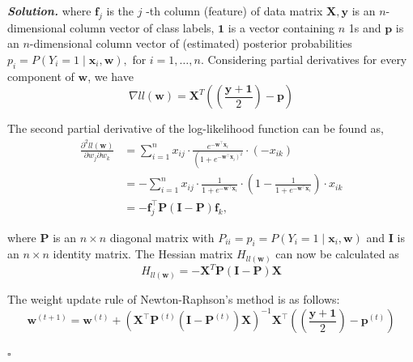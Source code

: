 \documentclass[10pt]{article}
\newenvironment{solution}[1][\it{Solution}]{\textbf{#1. } }{$\square$}
\begin{document}
\begin{solution}
where $\mathbf{f}_{j}$ is the $j$ -th column (feature) of data matrix $\mathbf{X}, \mathbf{y}$ is an $n$-dimensional column vector of class labels, $\mathbf{1}$ is a vector containing $n$ 1s and $\mathbf{p}$ is an $n$-dimensional column vector of (estimated) posterior probabilities $p_{i}=P\left(Y_{i}=1 \mid \mathbf{x}_{i}, \mathbf{w}\right),$ for $i=1, \ldots, n$. Considering partial derivatives for every component of $\mathbf{w}$, we have
$$
\nabla ll(\mathbf{w})=\mathbf{X}^{T}\left(\left(\frac{\mathbf{y} + \mathbf{1}}{2}\right)-\mathbf{p}\right)
$$

The second partial derivative of the log-likelihood function can be found as,
$$
\begin{aligned}
\frac{\partial^{2} l l(\mathbf{w})}{\partial w_{j} \partial w_{k}} &=\sum_{i=1}^{n} x_{ij} \cdot \frac{e^{-\mathbf{w}^{\top} \mathbf{x}_{i}}}{\left(1+e^{\left.-\mathbf{w}^{\top} \mathbf{x}_{i}\right)^{2}}\right.} \cdot\left(-x_{i k}\right) \\
&=-\sum_{i=1}^{n} x_{i j} \cdot \frac{1}{1+e^{-\mathbf{w}^{\top} \mathbf{x}_{i}}} \cdot\left(1-\frac{1}{1+e^{-\mathbf{w}^{\top} \mathbf{x}_{i}}}\right) \cdot x_{i k} \\
&=-\mathbf{f}_{j}^{\top} \mathbf{P}(\mathbf{I}-\mathbf{P}) \mathbf{f}_{k},
\end{aligned}
$$

where $\mathbf{P}$ is an $n \times n$ diagonal matrix with $P_{i i}=p_{i}=P\left(Y_{i}=1 \mid \mathbf{x}_{i}, \mathbf{w}\right)$ and $\mathbf{I}$ is an $n \times n$ identity matrix. The Hessian matrix $H_{l l(\mathbf{w})}$ can now be calculated as
$$
H_{ll(\mathbf{w})}=-\mathbf{X}^{T} \mathbf{P}(\mathbf{I}-\mathbf{P}) \mathbf{X}
$$

The weight update rule of Newton-Raphson's method is as follows:
$$
\mathbf{w}^{(t+1)}=\mathbf{w}^{(t)}+\left(\mathbf{X}^{\top} \mathbf{P}^{(t)}\left(\mathbf{I}-\mathbf{P}^{(t)}\right) \mathbf{X}\right)^{-1} \mathbf{X}^{\top}\left(\left(\frac{\mathbf{y}+\mathbf{1}}{2}\right)-\mathbf{p}^{(t)}\right)
$$

\end{solution}
\end{document}
